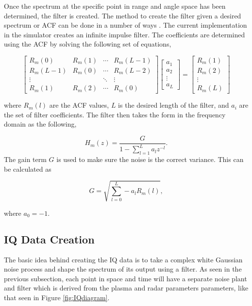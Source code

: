 \documentclass[draft,ras]{agutex}
\begin{document}
\begin{article}
Once the spectrum at the specific point in range and angle space has been determined, the filter is created. The method to create the filter given a desired spectrum or ACF can be done in a number of ways \cite{Kasdin:1995wi}. The current implementation in the simulator creates an infinite impulse filter. The coefficients are determined using the ACF by solving the following set of equations,

\begin{equation}
\label{eq:filtereq}
\begin{bmatrix} R_m(0) & R_m(1)& \cdots & R_m(L-1) \\ R_m(L-1) & R_m(0)& \cdots & R_m(L-2)\\ \vdots & &\ddots  & \vdots \\  R_m(1) & R_m(2) & \cdots & R_m(0) \end{bmatrix} \left[ \begin{array}{c} a_1\\ a_2\\\vdots \\ a_L \end{array} \right]=\left[ \begin{array}{c} R_m(1) \\ R_m(2)\\ \vdots \\R_m(L) \end{array} \right]
\end{equation}

\noindent where $R_m(l)$ are the ACF values, $L$ is the desired length of the filter, and $ a_i$ are the set of filter coefficients. The filter then takes the form in the frequency domain as the following,

\begin{equation}
\label{eq:filtz}
H_m(z) = \frac{G}{1-\displaystyle \sum_{l=1}^{L} a_l z^{-l}}.
\end{equation}
\noindent The gain term $G$ is used to make sure the noise is the correct variance. This can be calculated as 

\begin{equation}
\label{eq:gainterm}
G=\sqrt{\displaystyle \sum_{l=0}^L -a_l R_m(l)},
\end{equation}

\noindent where $a_0=-1$. 

\subsection{ IQ Data Creation}
The basic idea behind creating the IQ data is to take a complex white Gaussian noise process and shape the spectrum of its output using a filter. As seen in the previous subsection, each point in space and time will have a separate noise plant and filter which is derived from the plasma and radar parameters parameters, like that seen in Figure \ref{fig:IQdiagram}. 


\end{article}
\end{document}
